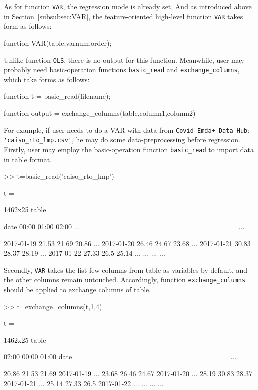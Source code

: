 \documentclass[10pt]{article}
\numberwithin{equation}{section}
\numberwithin{table}{section}
\numberwithin{figure}{section}
\begin{document}
As for function \verb!VAR!, the regression mode is already set. And as introduced above in Section~\ref{subsubsec:VAR}, the feature-oriented high-level function \verb!VAR! takes form as follows:

\begin{Code}
function VAR(table,varnum,order);
\end{Code}

Unlike function \verb!OLS!, there is no output for this function. Meanwhile, user may probably need basic-operation functions \verb!basic_read! and \verb!exchange_columns!, which take forms as follows:

\begin{Code}
function t = basic_read(filename);
\end{Code}

\begin{Code}
function output = exchange_columns(table,column1,column2)
\end{Code}

For example, if user needs to do a VAR with data from \verb!Covid Emda+ Data Hub!: \verb!'caiso_rto_lmp.csv'!, he may do some data-preprocessing before regression. Firstly, user may employ the basic-operation function \verb!basic_read! to import data in table format. 
\begin{Command}
>> t=basic_read('caiso_rto_lmp')

t =

  1462x25 table

       date       00:00     01:00     02:00             ...
    __________    ______    ______    ______            ...

    2017-01-19     21.53     21.69     20.86            ...
    2017-01-20     26.46     24.67     23.68            ...
    2017-01-21     30.83     28.37     28.19            ...
    2017-01-22     27.33     26.5      25.14            ...
                ...                  ...                ...
\end{Command}

Secondly, \verb!VAR! takes the fist few columns from table as variables by default, and the other columns remain untouched. Accordingly, function \verb!exchange_columns! should be applied to exchange columns of table. 
\begin{Command}
>> t=exchange_columns(t,1,4)

t =

  1462x25 table

    02:00     00:00     01:00        date    
    ______    ______    ______    __________            ...

    20.86     21.53     21.69     2017-01-19            ...
    23.68     26.46     24.67     2017-01-20            ...
    28.19     30.83     28.37     2017-01-21            ...
    25.14     27.33     26.5      2017-01-22            ...
            ...                  ...                    ...
\end{Command}
\end{document}
